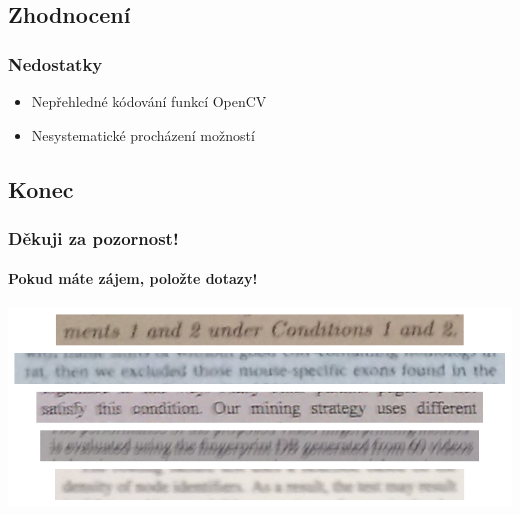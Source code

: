 \documentclass{beamer}
\begin{document}
\subsection{Zhodnocení}
\begin{frame}
\frametitle{Nedostatky}
\begin{itemize}
\item Nepřehledné kódování funkcí OpenCV
\item Nesystematické procházení možností 
\end{itemize}
\end{frame}
\subsection{Konec}
\begin{frame}
\frametitle{Děkuji za pozornost!}
\framesubtitle{Pokud máte zájem, položte dotazy!}
\centering
\includegraphics[width=1\textwidth]{img/bmod-medium.png}\\
\end{frame}
\end{document}
